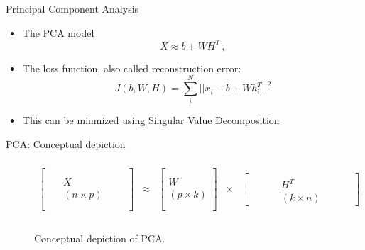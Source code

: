 \documentclass[10pt]{beamer}
\begin{document}
\begin{frame}{Principal Component Analysis}

\begin{itemize}
\item The PCA model
\[
X \approx b +  W H^T\,,
\]
\item The loss function, also called {\color{uured} reconstruction error}:
\[
J(b,W,H) = \sum_i^N ||x_i - b +  W h_i^T||^2
\]
\pause
\item This can be minmized using {\color{uured} Singular Value Decomposition}
\end{itemize}

\end{frame}

\begin{frame}{PCA: Conceptual depiction}

\scriptsize

\begin{figure}
\begin{centering}
\[
\begin{array}{ccccc}
\\
\left[\begin{array}{ccc}
 & \text{ }\\
\\
\text{ } & X & \text{ }\\
 & (n \times p)\text{ }\\
\\
\end{array}\right] & \approx & \left[\begin{array}{c}
\\
\\
W\\
(p\times k)\\
\\
\end{array}\right] & \times & \left[\begin{array}{ccccc}
 &  & \text{ }\\
\text{ } & \text{ } & H^T & \text{ } & \text{ }\\
 &  & (k\times n)
\end{array}\right]\\
\\
\end{array}
\]
\end{centering}
\caption{Conceptual depiction of PCA.}
\label{matrix_decomposition_view}
\end{figure}

\end{frame}
\end{document}
